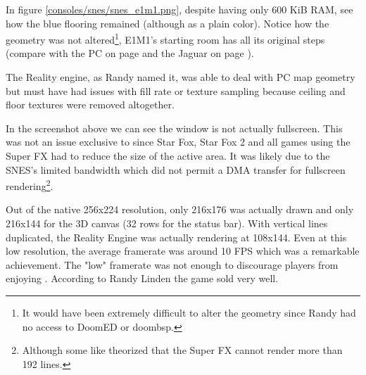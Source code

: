 In figure \ref{consoles/snes/snes_e1m1.png}, despite having only 600 KiB RAM, see how the blue flooring remained (although as a plain color). Notice how the geometry was not altered\footnote{It would have been extremely difficult to alter the geometry since Randy had no access to DoomED or doombsp.}, E1M1's starting room has all its original steps (compare with the PC on page \pageref{mashed_potatoes1.png} and the Jaguar on page \pageref{doom_jaguar3.png}).\\
\par The Reality engine, as Randy named it, was able to deal with PC map geometry but must have had issues with fill rate or texture sampling because ceiling and floor textures were removed altogether.













\par
In the screenshot above we can see the window is not actually fullscreen. This was not an issue exclusive to \doom{} since Star Fox, Star Fox 2 and all games using the Super FX had to reduce the size of the active area. It was likely due to the SNES's limited bandwidth which did not permit a DMA transfer for fullscreen rendering\footnote{Although some like  theorized that the Super FX cannot render more than 192 lines.}.\\
\par
Out of the native 256x224 resolution, only 216x176 was actually drawn and only 216x144 for the 3D canvas (32 rows for the status bar). With vertical lines duplicated, the Reality Engine was actually rendering at 108x144. Even at this low resolution, the average framerate was around 10 FPS which was a remarkable achievement. The "low" framerate was not enough to discourage players from enjoying \doom. According to Randy Linden the game sold very well.







